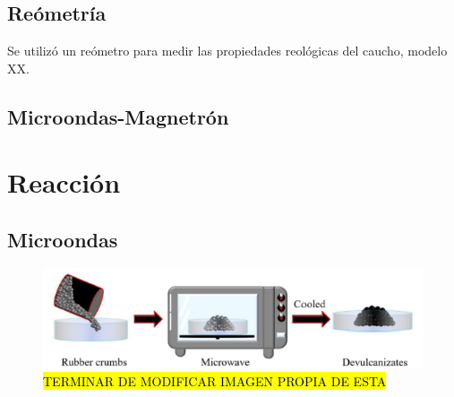 \begin{multicols}{2}


\subsection{Reómetría}

Se utilizó un reómetro para medir las propiedades reológicas del caucho, modelo XX.

\subsection{Microondas-Magnetrón}

\section{Reacción}

\subsection{Microondas}

\begin{figure}[H]
    \centering
\includegraphics[scale=0.6]{00Figuras/microwave.png}
    \caption{\hl{TERMINAR DE MODIFICAR IMAGEN PROPIA DE ESTA}}
    \label{PUC}
\end{figure}

\end{multicols}




